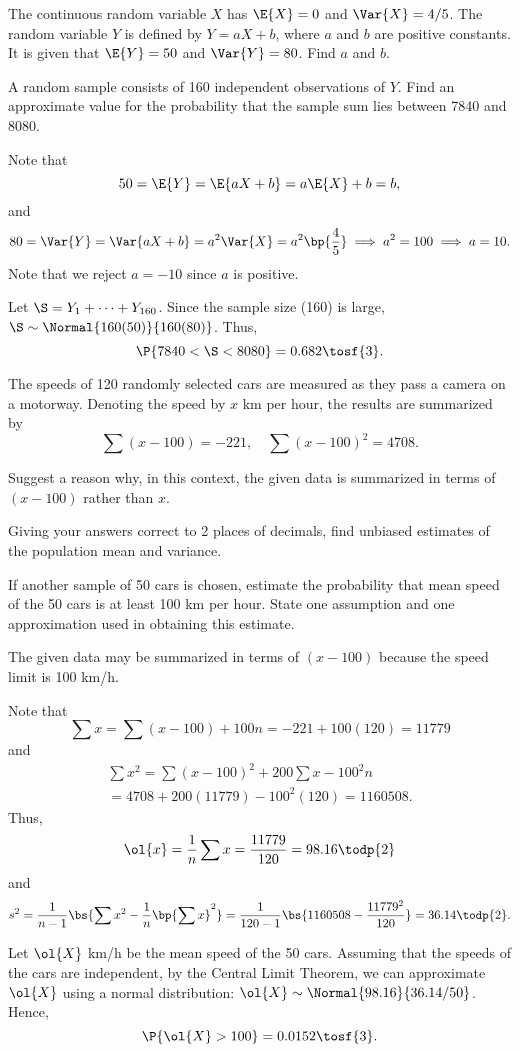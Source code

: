 \begin{problem}
    The continuous random variable $X$ has $\E{X} = 0$ and $\Var{X} = 4/5$. The random variable $Y$ is defined by $Y=aX+b$, where $a$ and $b$ are positive constants. It is given that $\E{Y}=50$ and $\Var{Y}=80$. Find $a$ and $b$.

    A random sample consists of 160 independent observations of $Y$. Find an approximate value for the probability that the sample sum lies between 7840 and 8080.
\end{problem}
\begin{solution}
    Note that \[50 = \E{Y} = \E{aX + b} = a\E{X} + b = b,\] and \[80 = \Var{Y} = \Var{aX+b} = a^2 \Var{X} = a^2 \bp{\frac45} \implies a^2 = 100 \implies a = 10.\] Note that we reject $a = -10$ since $a$ is positive.

    Let $\S = Y_1 + \dots + Y_{160}$. Since the sample size (160) is large, $\S \sim \Normal{160(50)}{160(80)}$. Thus, \[\P{7840 < \S < 8080} = 0.682 \tosf{3}.\]
\end{solution}

\begin{problem}
    The speeds of 120 randomly selected cars are measured as they pass a camera on a motorway. Denoting the speed by $x$ km per hour, the results are summarized by \[\sum (x - 100) = -221, \quad \sum (x - 100)^2 = 4708.\] 
    
    Suggest a reason why, in this context, the given data is summarized in terms of $(x-100)$ rather than $x$.

    Giving your answers correct to 2 places of decimals, find unbiased estimates of the population mean and variance.

    If another sample of 50 cars is chosen, estimate the probability that mean speed of the 50 cars is at least 100 km per hour. State one assumption and one approximation used in obtaining this estimate.
\end{problem}
\begin{solution}
    The given data may be summarized in terms of $(x-100)$ because the speed limit is 100 km/h.

    Note that \[\sum x = \sum (x-100) + 100n = -221 + 100(120) = 11779\] and
    \begin{gather*}
        \sum x^2 = \sum (x-100)^2 + 200 \sum x - 100^2n\\
        = 4708 + 200(11779) - 100^2 (120) = 1160508.    
    \end{gather*}
    Thus, \[\ol{x} = \frac1n \sum x = \frac{11779}{120} = 98.16 \todp{2}\] and \[s^2 = \frac1{n-1} \bs{\sum x^2 - \frac1n \bp{\sum x}^2} = \frac{1}{120 - 1} \bs{1160508 - \frac{11779^2}{120}} = 36.14 \todp{2}.\]

    Let $\ol{X}$ km/h be the mean speed of the 50 cars. Assuming that the speeds of the cars are independent, by the Central Limit Theorem, we can approximate $\ol{X}$ using a normal distribution: $\ol{X} \sim \Normal{98.16}{36.14/50}$. Hence, \[\P{\ol{X} > 100} = 0.0152 \tosf{3}.\]
\end{solution}

